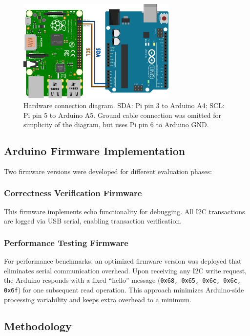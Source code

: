 \begin{figure}[h]
	\centering
	\includegraphics[width=0.7\textwidth]{images/HW_config.png}
	\caption{Hardware connection diagram. SDA: Pi pin 3 to Arduino A4; SCL: Pi pin 5 to Arduino A5. Ground cable connection was omitted for simplicity of the diagram, but uses Pi pin 6 to Arduino GND.}
	\label{fig:hw-connection}
\end{figure}

\subsection{Arduino Firmware Implementation}
\label{subsec:eval-setup-fw}

Two firmware versions were developed for different evaluation phases:

\subsubsection{Correctness Verification Firmware}
This firmware implements echo functionality for debugging. All I2C transactions are logged via USB serial, enabling transaction verification.

\subsubsection{Performance Testing Firmware}
For performance benchmarks, an optimized firmware version was deployed that eliminates serial communication overhead. Upon receiving any I2C write request, the Arduino responds with a fixed ``hello'' message (\texttt{0x68, 0x65, 0x6c, 0x6c, 0x6f}) for one subsequent read operation. This approach minimizes Arduino-side processing variability and keeps extra overhead to a minimum.

\subsection{Methodology}
\label{subsec:eval-setup-bench}

